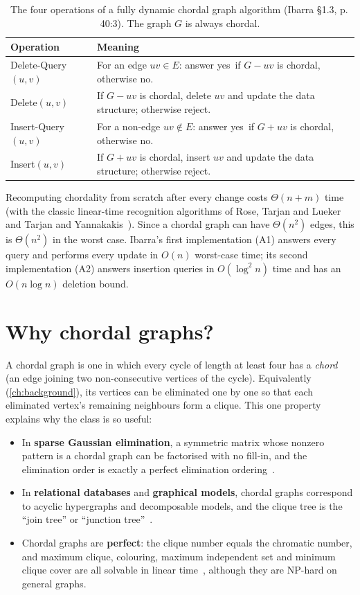 \documentclass[11pt,a4paper,oneside]{report}
\theoremstyle{plain}
\theoremstyle{definition}
\theoremstyle{remark}
\newcommand{\yes}{\textsf{yes}}
\newcommand{\no}{\textsf{no}}
\newcommand{\op}[1]{\textsf{#1}}
\begin{document}
\begin{table}[ht]
\centering
\caption[The four operations]{The four operations of a fully dynamic chordal graph algorithm
(Ibarra \S1.3, p.\,40:3). The graph \(G\) is always chordal.}\label{tab:ops}
\begin{tabularx}{\textwidth}{@{}lX@{}}
\toprule
\textbf{Operation} & \textbf{Meaning}\\
\midrule
\op{Delete-Query}\((u,v)\) & For an edge \(uv\in E\): answer \yes\ if \(G-uv\) is chordal, otherwise \no.\\
\op{Delete}\((u,v)\) & If \(G-uv\) is chordal, delete \(uv\) and update the data structure; otherwise reject.\\
\op{Insert-Query}\((u,v)\) & For a non-edge \(uv\notin E\): answer \yes\ if \(G+uv\) is chordal, otherwise \no.\\
\op{Insert}\((u,v)\) & If \(G+uv\) is chordal, insert \(uv\) and update the data structure; otherwise reject.\\
\bottomrule
\end{tabularx}
\end{table}

Recomputing chordality from scratch after every change costs \(\Theta(n+m)\) time (with the
classic linear-time recognition algorithms of Rose, Tarjan and Lueker~\cite{rose1976} and
Tarjan and Yannakakis~\cite{tarjan1984}). Since a chordal graph can have \(\Theta(n^2)\) edges,
this is \(\Theta(n^2)\) in the worst case. Ibarra's first implementation (A1) answers every query and performs
every update in \(O(n)\) worst-case time; its second implementation (A2) answers insertion
queries in \(O(\log^2 n)\) time and has an \(O(n\log n)\) deletion bound.

\section{Why chordal graphs?}
A chordal graph is one in which every cycle of length at least four has a \emph{chord} (an edge
joining two non-consecutive vertices of the cycle). Equivalently (\cref{ch:background}), its
vertices can be eliminated one by one so that each eliminated vertex's remaining neighbours
form a clique. This one property explains why the class is so useful:
\begin{itemize}
\item In \textbf{sparse Gaussian elimination}, a symmetric matrix whose nonzero pattern is a
  chordal graph can be factorised with no fill-in, and the elimination order is exactly a
  perfect elimination ordering~\cite{rose1976,blair1993}.
\item In \textbf{relational databases} and \textbf{graphical models}, chordal graphs
  correspond to acyclic hypergraphs and decomposable models, and the clique tree is the
  ``join tree'' or ``junction tree''~\cite{tarjan1984}.
\item Chordal graphs are \textbf{perfect}: the clique number equals the chromatic number, and
  maximum clique, colouring, maximum independent set and minimum clique cover are all solvable
  in linear time~\cite{golumbic1980}, although they are NP-hard on general graphs.
\end{itemize}
\end{document}
